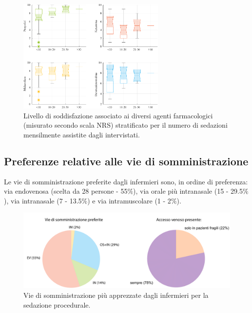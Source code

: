 \begin{figure}[!h]
    \centering
    \includegraphics[width=0.65\textwidth]{Figure/qualita-strat-frequenza.pdf}
    \caption{Livello di soddisfazione associato ai diversi agenti farmacologici (misurato secondo scala NRS) stratificato per il numero di sedazioni mensilmente assistite dagli intervistati.}
    \label{fig:qualitafrequenza}
\end{figure}

\subsection*{Preferenze relative alle vie di somministrazione}

Le vie di somministrazione preferite dagli infermieri sono, in ordine di preferenza: via endovenosa (scelta da 28 persone - 55$\%$), via orale più intranasale (15 - 29.5$\%$), via intranasale (7 - 13.5$\%$) e via intramuscolare (1 - 2$\%$). 

\begin{figure}[!h]
    \centering
    \includegraphics[width=1\textwidth]{Figure/sommicrosoftchiaro.pdf}
    \caption{Vie di somministrazione più apprezzate dagli infermieri per la sedazione procedurale.}
    \label{fig:viedisomm}
\end{figure}




